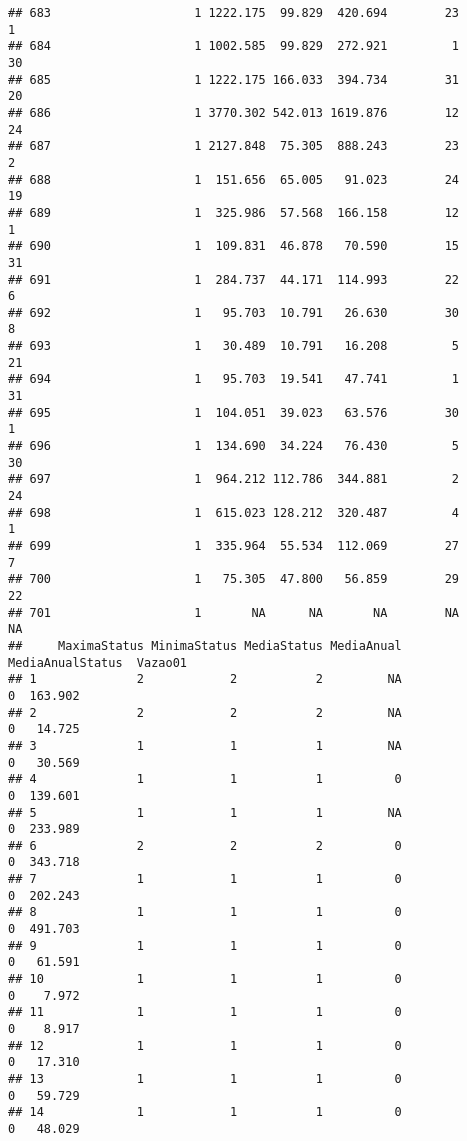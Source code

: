 \documentclass[
]{article}
\begin{document}
\begin{verbatim}
## 683                    1 1222.175  99.829  420.694        23         1
## 684                    1 1002.585  99.829  272.921         1        30
## 685                    1 1222.175 166.033  394.734        31        20
## 686                    1 3770.302 542.013 1619.876        12        24
## 687                    1 2127.848  75.305  888.243        23         2
## 688                    1  151.656  65.005   91.023        24        19
## 689                    1  325.986  57.568  166.158        12         1
## 690                    1  109.831  46.878   70.590        15        31
## 691                    1  284.737  44.171  114.993        22         6
## 692                    1   95.703  10.791   26.630        30         8
## 693                    1   30.489  10.791   16.208         5        21
## 694                    1   95.703  19.541   47.741         1        31
## 695                    1  104.051  39.023   63.576        30         1
## 696                    1  134.690  34.224   76.430         5        30
## 697                    1  964.212 112.786  344.881         2        24
## 698                    1  615.023 128.212  320.487         4         1
## 699                    1  335.964  55.534  112.069        27         7
## 700                    1   75.305  47.800   56.859        29        22
## 701                    1       NA      NA       NA        NA        NA
##     MaximaStatus MinimaStatus MediaStatus MediaAnual MediaAnualStatus  Vazao01
## 1              2            2           2         NA                0  163.902
## 2              2            2           2         NA                0   14.725
## 3              1            1           1         NA                0   30.569
## 4              1            1           1          0                0  139.601
## 5              1            1           1         NA                0  233.989
## 6              2            2           2          0                0  343.718
## 7              1            1           1          0                0  202.243
## 8              1            1           1          0                0  491.703
## 9              1            1           1          0                0   61.591
## 10             1            1           1          0                0    7.972
## 11             1            1           1          0                0    8.917
## 12             1            1           1          0                0   17.310
## 13             1            1           1          0                0   59.729
## 14             1            1           1          0                0   48.029

\end{verbatim}
\end{document}
